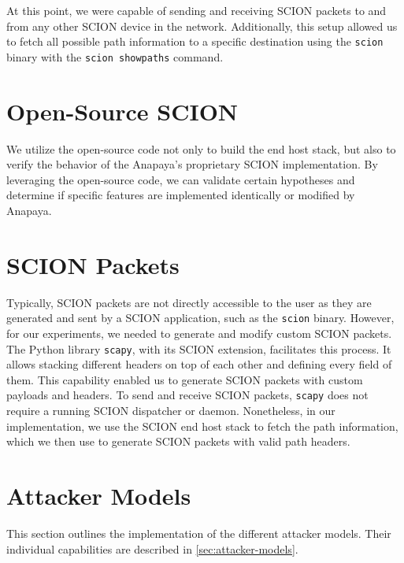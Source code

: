 At this point, we were capable of sending and receiving SCION packets to and from any other SCION device in the network.
Additionally, this setup allowed us to fetch all possible path information to a specific destination using the \texttt{scion} binary with the \texttt{scion showpaths} command.


\section{Open-Source SCION}
We utilize the open-source code not only to build the end host stack, but also to verify the behavior of the Anapaya's proprietary SCION implementation.
By leveraging the open-source code, we can validate certain hypotheses and determine if specific features are implemented identically or modified by Anapaya.


\section{SCION Packets}
\label{sec:impl:SCIONpackets}
Typically, SCION packets are not directly accessible to the user as they are generated and sent by a SCION application, such as the \texttt{scion} binary.
However, for our experiments, we needed to generate and modify custom SCION packets.
The Python library \texttt{scapy}, with its SCION extension, facilitates this process.
It allows stacking different headers on top of each other and defining every field of them.
This capability enabled us to generate SCION packets with custom payloads and headers.
To send and receive SCION packets, \texttt{scapy} does not require a running SCION dispatcher or daemon.
Nonetheless, in our implementation, we use the SCION end host stack to fetch the path information, which we then use to generate SCION packets with valid path headers.




\section{Attacker Models}
\label{sec:impl:attackerModel}

This section outlines the implementation of the different attacker models.
Their individual capabilities are described in \cref{sec:attacker-models}.


